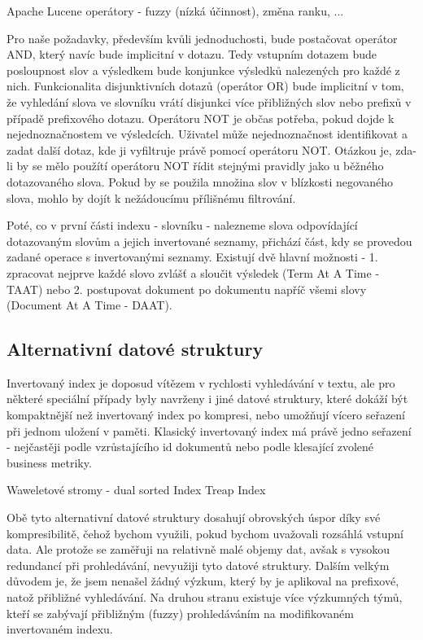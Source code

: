 \documentclass[11pt]{article}
\begin{document}
Apache Lucene operátory - fuzzy (nízká účinnost), změna ranku, ...

Pro naše požadavky, především kvůli jednoduchosti, bude postačovat operátor
AND, který navíc bude implicitní v dotazu. Tedy vstupním dotazem bude
posloupnost slov a výsledkem bude konjunkce výsledků nalezených pro každé z
nich. Funkcionalita disjunktivních dotazů (operátor OR) bude implicitní v tom,
že vyhledání slova ve slovníku vrátí disjunkci více přibližných slov nebo
prefixů v případě prefixového dotazu.  Operátoru NOT je občas potřeba, pokud
dojde k nejednoznačnostem ve výsledcích.  Uživatel může nejednoznačnost
identifikovat a zadat další dotaz, kde ji vyfiltruje právě pomocí operátoru
NOT. Otázkou je, zda-li by se mělo použítí operátoru NOT řídit stejnými
pravidly jako u běžného dotazovaného slova. Pokud by se použila množina slov v
blízkosti negovaného slova, mohlo by dojít k nežádoucímu přílišnému filtrování.

Poté, co v první části indexu - slovníku - nalezneme slova odpovídající
dotazovaným slovům a jejich invertované seznamy, přichází část, kdy se provedou
zadané operace s invertovanými seznamy.  Existují dvě hlavní možnosti - 1.
zpracovat nejprve každé slovo zvlášť a sloučit výsledek (Term At A Time - TAAT)
nebo 2. postupovat dokument po dokumentu napříč všemi slovy (Document At A Time
- DAAT).

\subsection{Alternativní datové struktury}
Invertovaný index je doposud vítězem v rychlosti vyhledávání v textu, ale pro
některé speciální případy byly navrženy i jiné datové struktury, které dokáží
být kompaktnější než invertovaný index po kompresi, nebo umožňují vícero
seřazení při jednom uložení v paměti. Klasický invertovaný index má právě jedno
seřazení - nejčastěji podle vzrůstajícího id dokumentů nebo podle klesající
zvolené business metriky.

Waweletové stromy - dual sorted Index
Treap Index

Obě tyto alternativní datové struktury dosahují obrovských úspor díky své
kompresibilitě, čehož bychom využili, pokud bychom uvažovali rozsáhlá vstupní
data. Ale protože se zaměřuji na relativně malé objemy dat, avšak s vysokou
redundancí při prohledávání, nevyužiji tyto datové struktury. Dalším velkým
důvodem je, že jsem nenašel žádný výzkum, který by je aplikoval na prefixové,
natož přibližné vyhledávání. Na druhou stranu existuje více výzkumných týmů,
kteří se zabývají přibližným (fuzzy) prohledáváním na modifikovaném invertovaném
indexu.
\end{document}
